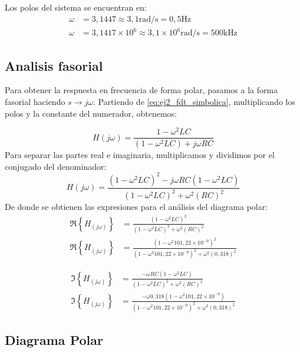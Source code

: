 Los polos del sistema se encuentran en:
\begin{align*}
    \omega &= 3,1447 \approx 3,1 \si{\radian\per\second} = 0,5 \si{\hertz} \\[6pt]
    \omega &= 3,1417 \times 10^6 \approx 3,1 \times 10^6 \si{\radian\per\second} = 500 \si{\kilo\hertz}
\end{align*}

\subsection{Analisis fasorial}

Para obtener la respuesta en frecuencia de forma polar, pasamos a la forma fasorial haciendo $s \to j\omega$. Partiendo
de \ref{eq:ej2_fdt_simbolica}, multiplicando los polos y la constante del numerador, obtenemos:

\begin{equation}
    H(j\omega) = \frac{1 - \omega^2 L C}{(1 - \omega^2 L C) + j\omega R C}
\end{equation}
Para separar las partes real e imaginaria, multiplicamos y dividimos por el conjugado del denominador:
\begin{equation*}
    H(j\omega) = \frac{(1 - \omega^2 L C)^2 - j\omega R C (1 - \omega^2 L C)}{(1 - \omega^2 L C)^2 + \omega^2 (R C)^2}
\end{equation*}
De donde se obtienen las expresiones para el análisis del diagrama polar:
\begin{align}
    \Re\left\{H_{(j\omega)}\right\} &= \frac{(1 - \omega^2 L C)^2}{(1 - \omega^2 L C)^2 + \omega^2 (R C)^2} \nonumber \\[6pt]
    \Re\left\{H_{(j\omega)}\right\} &= \frac{(1 - \omega^2 101,22 \times 10^{-9})^2}{(1 - \omega^2 101,22 \times 10^{-9})^2 + \omega^2 (0,318)^2}
    \label{eq:ej2_re_h}
\end{align}

\begin{align}
    \Im\left\{H_{(j\omega)}\right\} &= \frac{- \omega R C (1 - \omega^2 L C)}{(1 - \omega^2 L C)^2 + \omega^2 (R C)^2} \nonumber \\[6pt]
    \Im\left\{H_{(j\omega)}\right\} &= \frac{- \omega 0,318 (1 - \omega^2 101,22 \times 10^{-9})}{(1 - \omega^2 101,22 \times 10^{-9})^2 + \omega^2 (0,318)^2}
    \label{eq:ej2_im_h}
\end{align}

\subsection{Diagrama Polar}

